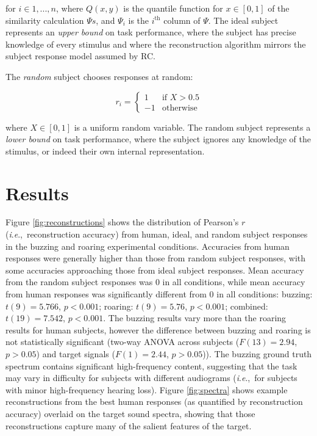 \documentclass[journal]{IEEEtran}
\newcommand{\ie}{\textit{i}.\textit{e}.,\ }
\begin{document}
for $i \in 1, ..., n$, where $Q(x, y)$ is the quantile function for $x \in [0, 1]$ of the similarity calculation $\Psi s$, and
$\Psi_i$ is the $i^\mathrm{th}$ column of $\Psi$.
The ideal subject represents an \textit{upper bound} on task performance,
where the subject has precise knowledge of every stimulus and where the reconstruction algorithm mirrors the subject response model assumed by RC.

The \textit{random} subject chooses responses at random:

\begin{equation}
    r_i =
    \begin{cases}
        1 & \text{if  } X > 0.5 \\
        -1 & \text{otherwise}
    \end{cases}
\end{equation}

where $X \in [0, 1]$ is a uniform random variable.
The random subject represents a \textit{lower bound} on task performance,
where the subject ignores any knowledge of the stimulus, or indeed their own internal representation.

\section{Results}

Figure \ref{fig:reconstructions} shows the distribution of Pearson's $r$ (\ie reconstruction accuracy) from human, ideal, and random subject responses in the buzzing and roaring experimental conditions.
Accuracies from human responses were generally higher than those from random subject responses,
with some accuracies approaching those from ideal subject responses.
Mean accuracy from the random subject responses was $0$ in all conditions,
while mean accuracy from human responses was significantly different from $0$ in all conditions: buzzing: $t(9) = 5.766$, $p < 0.001$; roaring: $t(9) = 5.76$, $p < 0.001$; combined: $t(19) = 7.542$, $p < 0.001$.
The buzzing results vary more than the roaring results for human subjects, however the difference between buzzing and roaring is not statistically significant
(two-way ANOVA across subjects ($F(13) = 2.94$, $p > 0.05$) and target signals ($F(1) = 2.44$, $p > 0.05$)).
The buzzing ground truth spectrum contains significant high-frequency content,
suggesting that the task may vary in difficulty for subjects with different audiograms (\ie for subjects with minor high-frequency hearing loss).
Figure \ref{fig:spectra} shows example reconstructions from the best human responses (as quantified by reconstruction accuracy) overlaid on the target sound spectra,
showing that those reconstructions capture many of the salient features of the target.
\end{document}
